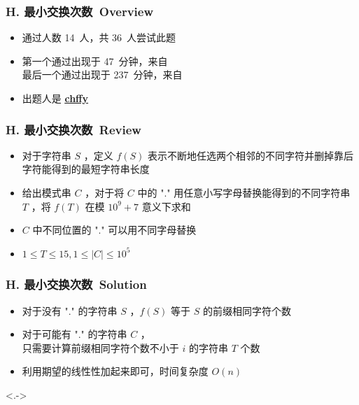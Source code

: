 \documentclass[notheorems]{beamer}
\newcommand{\zhProbH}{最小交换次数}	\newcommand{\AuthProbH}{\textbf{\underline{\href{http://codeforces.com/profile/chffy}{chffy}}}}
\newcommand{\AccInProbH}{14}	\newcommand{\SubInProbH}{36}	\newcommand{\RatInProbH}{38.89\%}
\newcommand{\FirPenInProbH}{47}		\newcommand{\FirPerInProbH}{\NONE}
\newcommand{\LasPenInProbH}{237}	\newcommand{\LasPerInProbH}{\NONE}
\begin{document}
\begin{frame}[label = ProbH]
\frametitle{H. \zhProbH\ Overview}
\begin{spacing}{2.0} \large
\begin{itemize}[<+->]
\item 通过人数 \AccInProbH\ 人，共 \SubInProbH\ 人尝试此题
\item 第一个通过出现于 \FirPenInProbH\ 分钟，来自 \FirPerInProbH\ 
\\ 最后一个通过出现于 \LasPenInProbH\ 分钟，来自 \LasPerInProbH\ 
\item 出题人是 \AuthProbH\ 
\end{itemize}
\end{spacing}
\end{frame}
\begin{frame}
\frametitle{H. \zhProbH\ Review}
\begin{spacing}{2.0} \large
\begin{itemize}[<+->]
\item 对于字符串 $S$ ，定义 $f(S)$ 表示不断地任选两个相邻的不同字符并删掉靠后字符能得到的最短字符串长度
\item 给出模式串 $C$ ，对于将 $C$ 中的 $\text{"."}$ 用任意小写字母替换能得到的不同字符串 $T$ ，将 $f(T)$ 在模 $10^9 + 7$ 意义下求和
\item $C$ 中不同位置的 $\text{"."}$ 可以\alert{用不同字母替换}
\item $1 \leq T \leq 15, 1 \leq |C| \leq 10^5$
\end{itemize}
\end{spacing}
\end{frame}
\begin{frame}
\frametitle{H. \zhProbH\ Solution}
\begin{spacing}{2.0} \large
\begin{itemize}[<+->]
\item 对于没有 $\text{"."}$ 的字符串 $S$ ，$f(S)$ 等于 $S$ 的\alert{前缀相同字符个数}
\item 对于可能有 $\text{"."}$ 的字符串 $C$ ， \\ 只需要计算前缀相同字符个数不小于 $i$ 的字符串 $T$ 个数
\item 利用期望的线性性加起来即可，时间复杂度 $O(n)$
\end{itemize}
\end{spacing}
\visible<.->{\hyperlink{Overview}{}}
\end{frame}
\end{document}
